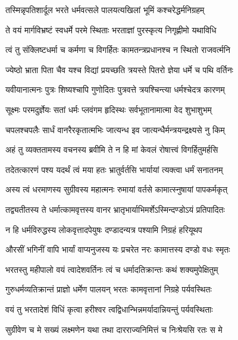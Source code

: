 \twolineshloka
{तस्मिन्नृपतिशार्दूल भरते धर्मवत्सले}
{पालयत्यखिलां भूमिं कश्चरेद्धर्मनिग्रहम्} %

\twolineshloka
{ते वयं मार्गविभ्रष्टं स्वधर्मे परमे स्थिताः}
{भरताज्ञां पुरस्कृत्य निगृह्णीमो यथाविधि} %

\twolineshloka
{त्वं तु संक्लिष्टधर्मा च कर्मणा च विगर्हितः}
{कामतन्त्रप्रधानश्च न स्थितो राजवर्त्मनि} %

\twolineshloka
{ज्येष्ठो भ्राता पिता चैव यश्च विद्यां प्रयच्छति}
{त्रयस्ते पितरो ज्ञेया धर्मे च पथि वर्तिनः} %

\twolineshloka
{यवीयानात्मनः पुत्रः शिष्यश्चापि गुणोदितः}
{पुत्रवत्ते त्रयश्चिन्त्या धर्मश्चेदत्र कारणम्} %

\twolineshloka
{सूक्ष्मः परमदुर्ज्ञेयः सतां धर्मः प्लवंगम}
{हृदिस्थः सर्वभूतानामात्मा वेद शुभाशुभम्} %

\twolineshloka
{चपलश्चपलैः सार्धं वानरैरकृतात्मभिः}
{जात्यन्ध इव जात्यन्धैर्मन्त्रयन्द्रक्ष्यसे नु किम्} %

\twolineshloka
{अहं तु व्यक्ततामस्य वचनस्य ब्रवीमि ते}
{न हि मां केवलं रोषात्त्वं विगर्हितुमर्हसि} %

\twolineshloka
{तदेतत्कारणं पश्य यदर्थं त्वं मया हतः}
{भ्रातुर्वर्तसि भार्यायां त्यक्त्वा धर्मं सनातनम्} %

\twolineshloka
{अस्य त्वं धरमाणस्य सुग्रीवस्य महात्मनः}
{रुमायां वर्तसे कामात्स्नुषायां पापकर्मकृत्} %

\twolineshloka
{तद्व्यतीतस्य ते धर्मात्कामवृत्तस्य वानर}
{भ्रातृभार्याभिमर्शेऽस्मिन्दण्डोऽयं प्रतिपादितः} %

\twolineshloka
{न हि धर्मविरुद्धस्य लोकवृत्तादपेयुषः}
{दण्डादन्यत्र पश्यामि निग्रहं हरियूथप} %

\twolineshloka
{औरसीं भगिनीं वापि भार्यां वाप्यनुजस्य यः}
{प्रचरेत नरः कामात्तस्य दण्डो वधः स्मृतः} %

\twolineshloka
{भरतस्तु महीपालो वयं त्वादेशवर्तिनः}
{त्वं च धर्मादतिक्रान्तः कथं शक्यमुपेक्षितुम्} %

\twolineshloka
{गुरुधर्मव्यतिक्रान्तं प्राज्ञो धर्मेण पालयन्}
{भरतः कामवृत्तानां निग्रहे पर्यवस्थितः} %

\twolineshloka
{वयं तु भरतादेशं विधिं कृत्वा हरीश्वर}
{त्वद्विधान्भिन्नमर्यादान्नियन्तुं पर्यवस्थिताः} %

\twolineshloka
{सुग्रीवेण च मे सख्यं लक्ष्मणेन यथा तथा}
{दारराज्यनिमित्तं च निःश्रेयसि रतः स मे} %


